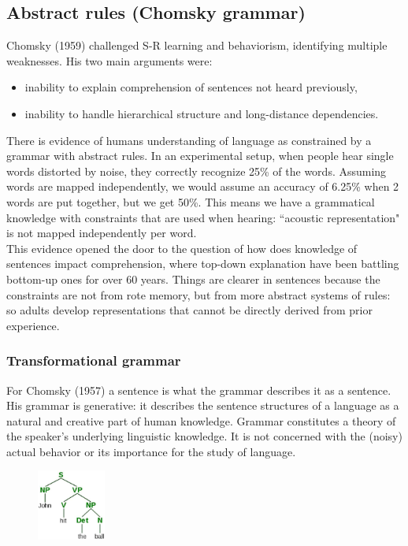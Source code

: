 \subsection{Abstract rules (Chomsky grammar)}
Chomsky (1959) challenged S-R learning and behaviorism, identifying multiple weaknesses. His two main arguments were:
\begin{itemize}
    \item inability to explain comprehension of sentences not heard previously,
    \item inability to handle hierarchical structure and long-distance dependencies.
\end{itemize}

There is evidence of humans understanding of language as constrained by a grammar with abstract rules.
In an experimental setup, when people hear single words distorted by noise, they correctly recognize 25\% of the words. Assuming words are mapped independently, we would assume an accuracy of 6.25\% when 2 words are put together, but we get 50\%. This means we have a grammatical knowledge with constraints that are used when hearing: ``acoustic representation" is not mapped independently per word.\\

This evidence opened the door to the question of how does knowledge of sentences impact comprehension, where top-down explanation have been battling bottom-up ones for over 60 years.
Things are clearer in sentences because the constraints are not from rote memory, but from more abstract systems of rules: so adults develop representations that cannot be directly derived from prior experience.

\subsubsection{Transformational grammar}
For Chomsky (1957) a sentence is what the grammar describes it as a sentence.
His grammar is generative: it describes the sentence structures of a language as a natural and creative part of human knowledge.
Grammar constitutes a theory of the speaker's underlying linguistic 
knowledge. It is not concerned with the (noisy) actual behavior or its importance for the study of language.\\

\begin{figure}
  \centering
  \includegraphics[width=0.2\textwidth]{images/tree.png}
  \caption{}
  \label{fig:tree}
\end{figure}


